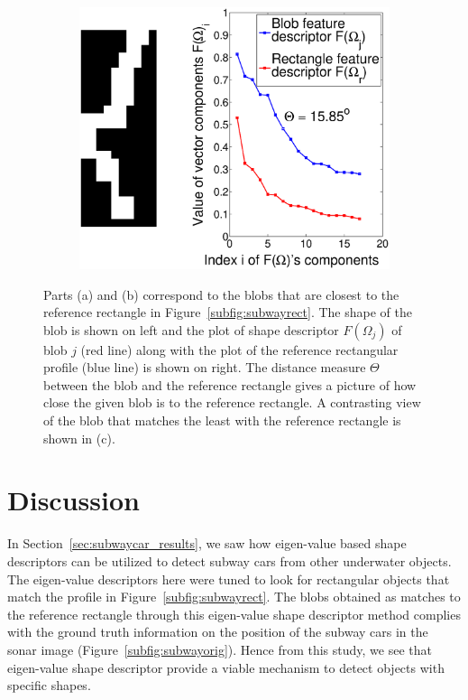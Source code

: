 \documentclass {udthesis}
\begin{document}
\begin{figure}
\begin{subfigure}[]{0.45\textwidth}
      \includegraphics[width=\textwidth]{worst1}
      \caption{}
      \label{subfig:subwayworst}
  \end{subfigure}
\caption{Parts (a) and (b) correspond to the blobs that are closest to the reference rectangle in Figure~\ref{subfig:subwayrect}. The shape of the blob is shown on left and the plot of shape descriptor $F(\Omega_j)$ of blob $j$ (red line) along with the plot of the reference rectangular profile (blue line) is shown on right. The distance measure $\Theta$ between the blob and the reference rectangle gives a picture of how close the given blob is to the reference rectangle. A contrasting view of the blob that matches the least with the reference rectangle is shown in (c).}
\end{figure}      


\section{Discussion}

In Section~\ref{sec:subwaycar_results}, we saw how eigen-value based shape descriptors can be utilized to detect subway cars from other underwater objects. The eigen-value descriptors here were tuned to look for rectangular objects that match the profile in Figure~\ref{subfig:subwayrect}. The blobs obtained as matches to the reference rectangle through this eigen-value shape descriptor method complies with the ground truth information on the position of the subway cars in the sonar image (Figure~\ref{subfig:subwayorig}). Hence from this study, we see that eigen-value shape descriptor provide a viable mechanism to detect objects with specific shapes.
\end{document}
